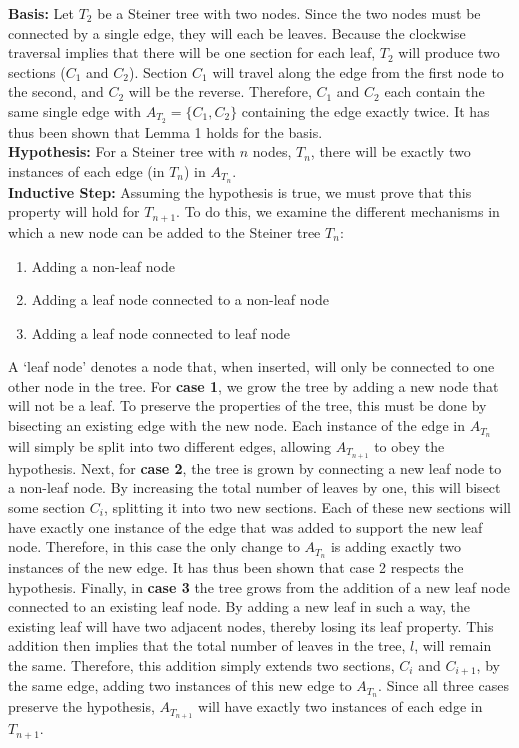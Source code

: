 \textbf{Basis:} Let $T_2$ be a Steiner tree with two nodes.
Since the two nodes must be connected by a single edge, they will each be leaves.
Because the clockwise traversal implies that there will be one section for each leaf, $T_2$ will produce two sections ($C_1$ and $C_2$).
Section $C_1$ will travel along the edge from the first node to the second, and $C_2$ will be the reverse.
Therefore, $C_1$ and $C_2$ each contain the same single edge with $A_{T_2} = \{C_1, C_2\}$ containing the edge exactly twice.
It has thus been shown that Lemma 1 holds for the basis. \\
\textbf{Hypothesis:} For a Steiner tree with $n$ nodes, $T_n$, there will be exactly two instances of each edge (in $T_n$) in $A_{T_n}$.\\
\textbf{Inductive Step:} Assuming the hypothesis is true, we must prove that this property will hold for $T_{n+1}$.
    To do this, we examine the different mechanisms in which a new node can be added to the Steiner tree $T_n$:
    \vspace{-2mm}
    \begin{enumerate}
        \item Adding a non-leaf node\vspace{-3mm}
        \item Adding a leaf node connected to a non-leaf node\vspace{-3mm}
        \item Adding a leaf node connected to leaf node\vspace{-3mm}
    \end{enumerate}

    A `leaf node' denotes a node that, when inserted, will only be connected to one other node in the tree.
    For \textbf{case 1}, we grow the tree by adding a new node that will not be a leaf.
    To preserve the properties of the tree, this must be done by bisecting an existing edge with the new node.
    Each instance of the edge in $A_{T_n}$ will simply be split into two different edges, allowing $A_{T_{n + 1}}$ to obey the hypothesis.
    Next, for \textbf{case 2}, the tree is grown by connecting a new leaf node to a non-leaf node.
    By increasing the total number of leaves by one, this will bisect some section $C_i$, splitting it into two new sections.
    Each of these new sections will have exactly one instance of the edge that was added to support the new leaf node.
    Therefore, in this case the only change to $A_{T_n}$ is adding exactly two instances of the new edge.
    It has thus been shown that case 2 respects the hypothesis.
    Finally, in \textbf{case 3} the tree grows from the addition of a new leaf node connected to an existing leaf node.
    By adding a new leaf in such a way, the existing leaf will have two adjacent nodes, thereby losing its leaf property.
    This addition then implies that the total number of leaves in the tree, $l$, will remain the same.
    Therefore, this addition simply extends two sections, $C_i$ and $C_{i+1}$, by the same edge, adding two instances of this new edge to $A_{T_n}$.
    Since all three cases preserve the hypothesis, $A_{T_{n + 1}}$ will have exactly two instances of each edge in $T_{n+1}$.

